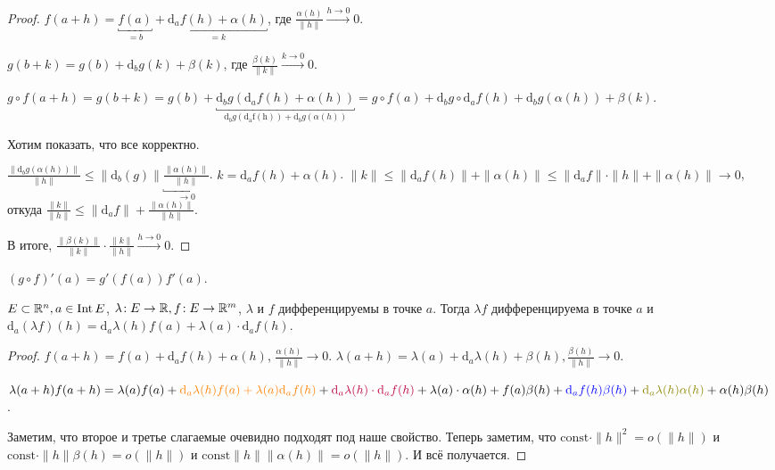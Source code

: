 \begin{proof}
    $f(a+h) = \underbracket{f(a)}_{=b} + \underbracket{\mathrm{d}_af(h) + \alpha(h)}_{=k}$, где  $\frac{\alpha(h)}{\|h\|} \xrightarrow{h \to 0} 0$.

    $g(b+k) = g(b) + \mathrm{d}_bg(k) + \beta(k)$, где  $\frac{\beta(k)}{\|k\|} \xrightarrow{k \to 0} 0$.

    $g \circ f(a + h) = g(b + k) = g(b) + \underbracket{\mathrm{d}_bg(\mathrm{d}_af(h)+\alpha(h))}_{\mathrm{d}_bg(\mathrm{d_af(h)}) + \mathrm{d}_bg(\alpha(h))} = g \circ f(a) + \mathrm{d}_bg \circ \mathrm{d}_af(h) + \mathrm{d}_bg(\alpha(h)) + \beta(k)$.

    Хотим показать, что все корректно.

    $\frac{\|\mathrm{d}_bg(\alpha(h))\|}{\|h\|} \le \|\mathrm{d}_b(g)\| \underbracket{\frac{\|\alpha(h)\|}{\|h\|}}_{\to 0}$. $k = \mathrm{d}_af(h) + \alpha(h)$.  $\|k\| \le \|\mathrm{d}_af(h)\| + \|\alpha(h)\| \le \|\mathrm{d}_af\| \cdot \|h\| + \|\alpha(h)\| \to 0$, откуда $\frac{\|k\|}{\|h\|} \le \|\mathrm{d}_af\| + \frac{\|\alpha(h)\|}{\|h\|}$.

    В итоге, $\frac{\|\beta(k)\|}{\|k\|} \cdot \frac{\|k\|}{\|h\|} \xrightarrow{h \to 0} 0$.
\end{proof}
\begin{consequence}
    $(g \circ f)'(a) = g'(f(a)) f'(a)$.
\end{consequence}
\begin{theorem}
    $E \subset \mathbb{R}^n, a \in \operatorname{Int} E$,  $\lambda\!: E \to \mathbb{R}, f\!: E \to \mathbb{R}^m$,  $\lambda$ и  $f$ дифференцируемы в точке  $a$. Тогда  $\lambda f$ дифференцируема в точке  $a$ и  $\mathrm{d}_a(\lambda f)(h) = \mathrm{d}_a \lambda(h) f(a) + \lambda(a) \cdot \mathrm{d}_af(h)$.
\end{theorem}
\begin{proof}
    $f(a+h) = f(a) + \mathrm{d}_af(h) + \alpha(h)$,  $\frac{\alpha(h)}{\|h\|} \to 0$. $\lambda(a + h) = \lambda(a) + \mathrm{d}_a\lambda(h) + \beta(h), \frac{\beta(h)}{\|h\|} \to 0$.

    $\lambda(a+h)f(a+h) = \lambda(a)f(a) + {\color{orange}\mathrm{d}_a\lambda(h)f(a) + \lambda(a)\mathrm{d}_af(h)} + {\color{purple}\mathrm{d}_a\lambda(h)\cdot \mathrm{d}_af(h)} + \lambda(a) \cdot \alpha(h) + f(a) \beta(h) + {\color{blue}\mathrm{d}_af(h)\beta(h)} + {\color{olive}\mathrm{d}_a\lambda(h)\alpha(h)} +\alpha(h)\beta(h)$. 

    Заметим, что {\color{orange}второе и третье} слагаемые очевидно подходят под наше свойство. Теперь заметим, что  {\color{purple}$\text{const} \cdot \|h\|^2 = o(\|h\|)$} и  {\color{blue}$\text{const} \cdot \|h\| \beta(h) = o(\|h\|)$} и  {\color{olive}$\text{const} \|h\| \|\alpha(h)\| = o(\|h\|)$}. И всё получается. 
\end{proof}
